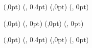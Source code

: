 
{%
  (\textwidth,0pt)    %
  {} %
    {} %
    {  %
      \makebox[0pt][l]{\rightmark}%
      \makebox[\linewidth]{}%
    }
  (\textwidth, 0.4pt) %
}
{%
  (\textwidth,0pt)    %
  {} %
    {} %
    {  %
      \makebox[\linewidth]{}%
      \makebox[0pt][r]{\pagemark}%
    }
  (\textwidth, 0pt)   %
}

{%
  (\textwidth,0pt)    %
  {} %
    {} %
    {}  %
  (\textwidth, 0pt) %
}
{%
  (\textwidth,0pt)    %
  {} %
    {} %
    {  %
      \makebox[\linewidth]{}%
      \makebox[0pt][r]{\pagemark}%
    }
  (\textwidth, 0pt)   %
}

\newcommand{\spezialkopfzeileBezeichnung}{}
{%
  (\textwidth,0pt)    %
  {} %
    {} %
    {  %
      \makebox[0pt][l]{\spezialkopfzeileBezeichnung}%
      \makebox[\linewidth]{}%
    }
  (\textwidth, 0.4pt) %
}
{%
  (\textwidth,0pt)    %
  {} %
    {} %
    {  %
      \makebox[\linewidth]{}%
      \makebox[0pt][r]{\pagemark}%
    }
  (\textwidth, 0pt)   %
}

